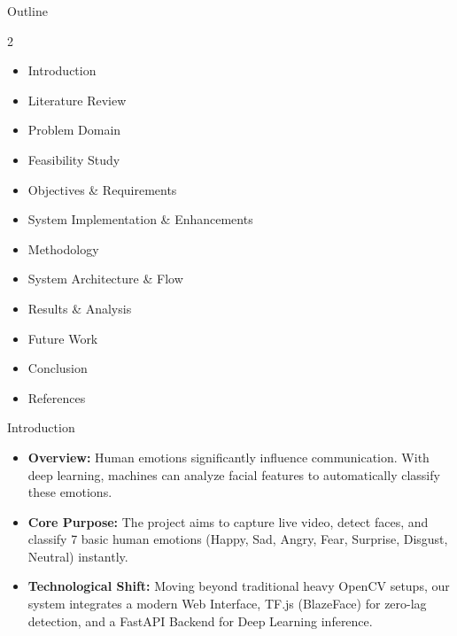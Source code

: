 \documentclass[aspectratio=169]{beamer}
\begin{document}
\begin{frame}{Outline}
\begin{multicols}{2}
\begin{itemize}
    \item Introduction
    \item Literature Review
    \item Problem Domain
    \item Feasibility Study
    \item Objectives \& Requirements
    \item System Implementation \& Enhancements
    \item Methodology
    \item System Architecture \& Flow
    \item Results \& Analysis
    \item Future Work
    \item Conclusion
    \item References
\end{itemize}
\end{multicols}
\end{frame}

\begin{frame}{Introduction}
\begin{itemize}
    \item \textbf{Overview:} Human emotions significantly influence communication. With deep learning, machines can analyze facial features to automatically classify these emotions.
    \item \textbf{Core Purpose:} The project aims to capture live video, detect faces, and classify 7 basic human emotions (Happy, Sad, Angry, Fear, Surprise, Disgust, Neutral) instantly.
    \item \textbf{Technological Shift:} Moving beyond traditional heavy OpenCV setups, our system integrates a modern Web Interface, TF.js (BlazeFace) for zero-lag detection, and a FastAPI Backend for Deep Learning inference.
\end{itemize}
\end{frame}
\end{document}
